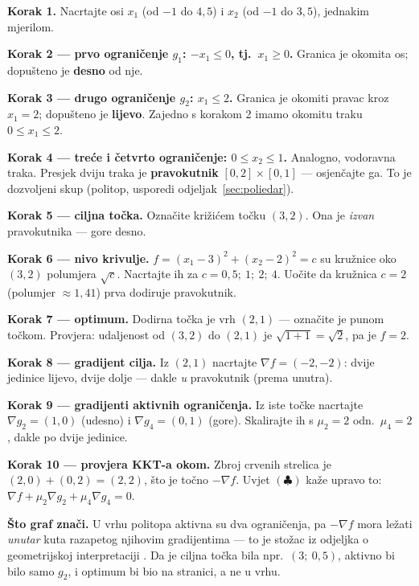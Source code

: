 \begin{crtanje}
\textbf{Korak 1.} Nacrtajte osi $x_1$ (od $-1$ do $4{,}5$) i $x_2$ (od $-1$ do
$3{,}5$), jednakim mjerilom.

\textbf{Korak 2 --- prvo ograničenje $g_1$: $-x_1 \le 0$, tj.\ $x_1 \ge 0$.}
Granica je okomita os; dopušteno je \textbf{desno} od nje.

\textbf{Korak 3 --- drugo ograničenje $g_2$: $x_1 \le 2$.} Granica je okomiti
pravac kroz $x_1 = 2$; dopušteno je \textbf{lijevo}. Zajedno s korakom 2 imamo
okomitu traku $0 \le x_1 \le 2$.

\textbf{Korak 4 --- treće i četvrto ograničenje: $0 \le x_2 \le 1$.} Analogno,
vodoravna traka. Presjek dviju traka je \textbf{pravokutnik}
$[0,2]\times[0,1]$ --- osjenčajte ga. To je dozvoljeni skup (politop, usporedi
odjeljak~\ref{sec:poliedar}).

\textbf{Korak 5 --- ciljna točka.} Označite križićem točku $(3,2)$. Ona je
\emph{izvan} pravokutnika --- gore desno.

\textbf{Korak 6 --- nivo krivulje.} $f = (x_1-3)^2+(x_2-2)^2 = c$ su kružnice
oko $(3,2)$ polumjera $\sqrt c$. Nacrtajte ih za $c = 0{,}5;\ 1;\ 2;\ 4$.
Uočite da kružnica $c = 2$ (polumjer $\approx 1{,}41$) prva dodiruje
pravokutnik.

\textbf{Korak 7 --- optimum.} Dodirna točka je vrh $(2,1)$ --- označite je punom
točkom. Provjera: udaljenost od $(3,2)$ do $(2,1)$ je $\sqrt{1+1}=\sqrt2$, pa
je $f = 2$. \checkmark

\textbf{Korak 8 --- gradijent cilja.} Iz $(2,1)$ nacrtajte
$\nabla f = (-2,-2)$: dvije jedinice lijevo, dvije dolje --- dakle
\emph{u} pravokutnik (prema unutra).

\textbf{Korak 9 --- gradijenti aktivnih ograničenja.} Iz iste točke nacrtajte
$\nabla g_2 = (1,0)$ (udesno) i $\nabla g_4 = (0,1)$ (gore). Skalirajte ih s
$\mu_2 = 2$ odn.\ $\mu_4 = 2$, dakle po dvije jedinice.

\textbf{Korak 10 --- provjera KKT-a okom.} Zbroj crvenih strelica je
$(2,0) + (0,2) = (2,2)$, što je točno $-\nabla f$. Uvjet $(\clubsuit)$ kaže
upravo to: $\nabla f + \mu_2\nabla g_2 + \mu_4\nabla g_4 = 0$.

\textbf{Što graf znači.} U vrhu politopa aktivna su dva ograničenja, pa
$-\nabla f$ mora ležati \emph{unutar} kuta razapetog njihovim gradijentima ---
to je stožac iz odjeljka o geometrijskoj interpretaciji . Da je ciljna
točka bila npr.\ $(3;\ 0{,}5)$, aktivno bi bilo samo $g_2$, i optimum bi bio na
stranici, a ne u vrhu.
\end{crtanje}

